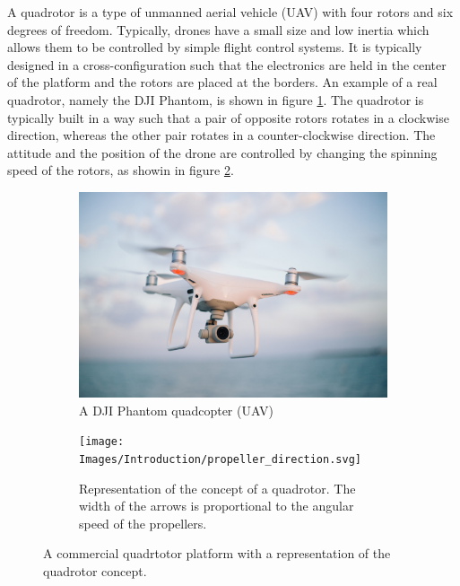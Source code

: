 \documentclass{thesisreport}
\begin{document}
A quadrotor is a type of unmanned aerial vehicle (UAV) with four rotors and six degrees of freedom. Typically, drones have a small size and low inertia which allows them to be controlled by simple flight control systems. It is typically designed in a cross-configuration such that the electronics are held in the center of the platform and the rotors are placed at the borders.
An example of a real quadrotor, namely the DJI Phantom, is shown in figure \ref{fig:drone}. The quadrotor is typically built in a way such that a pair of opposite rotors rotates in a clockwise direction, whereas the other pair rotates in a counter-clockwise direction.
The attitude and the position of the drone are controlled by changing the spinning speed of the rotors, as showin in figure \ref{fig:propeller_directions}.
 
 \begin{figure}[h]
     \centering
     \begin{subfigure}[b]{0.45\textwidth}
         \centering
         \includegraphics[width=\textwidth]{Images/Introduction/drone}
         \caption[Caption for LOF]{A DJI Phantom quadcopter (UAV)\protect\footnotemark}
         \label{fig:drone}
     \end{subfigure}
     \hfill
     \begin{subfigure}[b]{0.45\textwidth}
         \centering
         \texttt{[image: Images/Introduction/propeller\_direction.svg]}
         \caption{Representation of the concept of a quadrotor. The width of the arrows is proportional to the angular speed of the propellers.\cite{Bouabdalla2007}}
         \label{fig:propeller_directions}
     \end{subfigure}
        \caption{A commercial quadrtotor platform with a representation of the quadrotor concept.}
        \label{fig:three graphs}
\end{figure}
\end{document}
